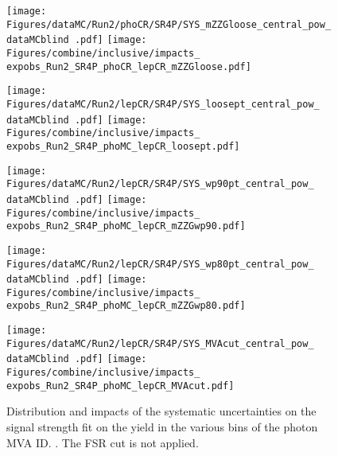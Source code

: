 \label{sec:impacts_inclusive}
\providecommand{\impactswidthscale}{0.6}

\begin{figure}
  \centering
  \texttt{[image: Figures/dataMC/Run2/phoCR/SR4P/SYS\_mZZGloose\_central\_pow\_\\dataMCblind .pdf]}
  \hfill
  \texttt{[image: Figures/combine/inclusive/impacts\_\\expobs\_Run2\_SR4P\_phoCR\_lepCR\_mZZGloose.pdf]}
  \caption{}
  \label{fig:inclusive_cutID_phoCR_mZZGloose}
\end{figure}

\begin{figure}
  \centering
  \texttt{[image: Figures/dataMC/Run2/lepCR/SR4P/SYS\_loosept\_central\_pow\_\\dataMCblind .pdf]}
  \hfill
  \texttt{[image: Figures/combine/inclusive/impacts\_\\expobs\_Run2\_SR4P\_phoMC\_lepCR\_loosept.pdf]}
  \caption{}
  \label{fig:inclusive_cutID_phoMC_loosept}
\end{figure}

\begin{figure}
  \centering
  \texttt{[image: Figures/dataMC/Run2/lepCR/SR4P/SYS\_wp90pt\_central\_pow\_\\dataMCblind .pdf]}
  \hfill
  \texttt{[image: Figures/combine/inclusive/impacts\_\\expobs\_Run2\_SR4P\_phoMC\_lepCR\_mZZGwp90.pdf]}
  \caption{}
  \label{fig:inclusive_mvaID_phoMC_mZZGwp90}
\end{figure}

\begin{figure}
  \centering
  \texttt{[image: Figures/dataMC/Run2/lepCR/SR4P/SYS\_wp80pt\_central\_pow\_\\dataMCblind .pdf]}
  \hfill
  \texttt{[image: Figures/combine/inclusive/impacts\_\\expobs\_Run2\_SR4P\_phoMC\_lepCR\_mZZGwp80.pdf]}
  \caption{}
  \label{fig:inclusive_mvaID_phoMC_mZZGwp80}
\end{figure}

\begin{figure}
  \centering
  \texttt{[image: Figures/dataMC/Run2/lepCR/SR4P/SYS\_MVAcut\_central\_pow\_\\dataMCblind .pdf]}
  \hfill
  \texttt{[image: Figures/combine/inclusive/impacts\_\\expobs\_Run2\_SR4P\_phoMC\_lepCR\_MVAcut.pdf]}
  \caption{Distribution and impacts of the systematic uncertainties on the signal strength fit
    on the yield in the various bins of the photon MVA ID.
    .
    The FSR cut is not applied.
  }
  \label{fig:inclusive_kin_phoMC_MVAcut}
\end{figure}


